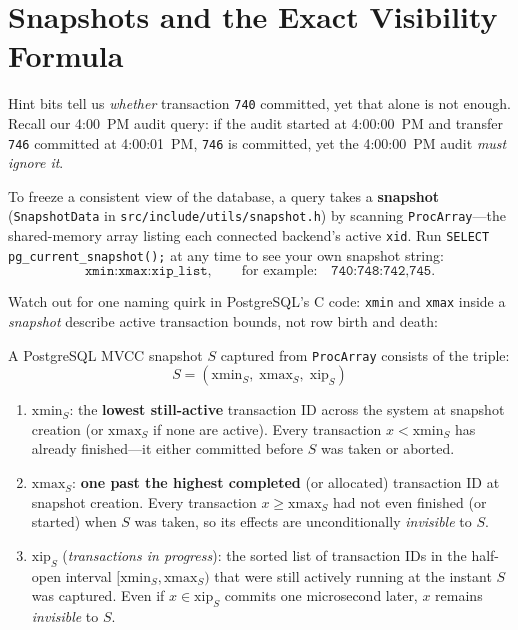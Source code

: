 \section{Snapshots and the Exact Visibility Formula}
\label{ch05:snapshot-visibility}

Hint bits tell us \emph{whether} transaction \texttt{740} committed, yet that alone is not enough. Recall our 4:00~PM audit query: if the audit started at 4:00:00~PM and transfer \texttt{746} committed at 4:00:01~PM, \texttt{746} is committed, yet the 4:00:00~PM audit \emph{must ignore it}.

To freeze a consistent view of the database, a query takes a \textbf{snapshot} (\texttt{SnapshotData} in \texttt{src/include/utils/snapshot.h}) by scanning \texttt{ProcArray}---the shared-memory array listing each connected backend's active \texttt{xid}. Run \texttt{SELECT pg\_current\_snapshot();} at any time to see your own snapshot string:
\[
  \texttt{xmin:xmax:xip\_list}, \qquad \text{for example:} \quad \texttt{740:748:742,745}.
\]

Watch out for one naming quirk in PostgreSQL's C code: \texttt{xmin} and \texttt{xmax} inside a \emph{snapshot} describe active transaction bounds, not row birth and death:

\begin{definition}
\label{ch05:def-snapshot}
A PostgreSQL MVCC snapshot $S$ captured from \texttt{ProcArray} consists of the triple:
\[
  S = (\mathrm{xmin}_S,\; \mathrm{xmax}_S,\; \mathrm{xip}_S)
\]
\begin{enumerate}
  \item $\mathrm{xmin}_S$: the \textbf{lowest still-active} transaction ID across the system at snapshot creation (or $\mathrm{xmax}_S$ if none are active). Every transaction $x < \mathrm{xmin}_S$ has already finished---it either committed before $S$ was taken or aborted.
  \item $\mathrm{xmax}_S$: \textbf{one past the highest completed} (or allocated) transaction ID at snapshot creation. Every transaction $x \ge \mathrm{xmax}_S$ had not even finished (or started) when $S$ was taken, so its effects are unconditionally \emph{invisible} to $S$.
  \item $\mathrm{xip}_S$ (\emph{transactions in progress}): the sorted list of transaction IDs in the half-open interval $[\mathrm{xmin}_S, \mathrm{xmax}_S)$ that were still actively running at the instant $S$ was captured. Even if $x \in \mathrm{xip}_S$ commits one microsecond later, $x$ remains \emph{invisible} to $S$.
\end{enumerate}
\end{definition}

